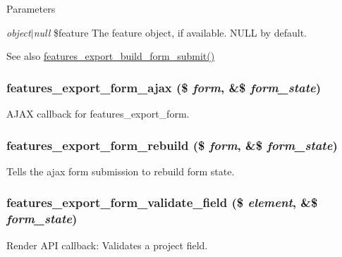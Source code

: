 \begin{DoxyParams}{Parameters}
\item[{\em object$|$null}]\$feature The feature object, if available. NULL by default.\end{DoxyParams}
\begin{DoxySeeAlso}{See also}
\hyperlink{features_8admin_8inc_afb232d8f40ae6b186567c6091ef0550e}{features\_\-export\_\-build\_\-form\_\-submit()} 
\end{DoxySeeAlso}
\hypertarget{features_8admin_8inc_a0c79652184d03c394b6bccba1704d93d}{
\subsubsection[{features\_\-export\_\-form\_\-ajax}]{\setlength{\rightskip}{0pt plus 5cm}features\_\-export\_\-form\_\-ajax (\$ {\em form}, \/  \&\$ {\em form\_\-state})}}
\label{features_8admin_8inc_a0c79652184d03c394b6bccba1704d93d}
AJAX callback for features\_\-export\_\-form. \hypertarget{features_8admin_8inc_a9d25b511fe410f560211cfa78edb08c2}{
\subsubsection[{features\_\-export\_\-form\_\-rebuild}]{\setlength{\rightskip}{0pt plus 5cm}features\_\-export\_\-form\_\-rebuild (\$ {\em form}, \/  \&\$ {\em form\_\-state})}}
\label{features_8admin_8inc_a9d25b511fe410f560211cfa78edb08c2}
Tells the ajax form submission to rebuild form state. \hypertarget{features_8admin_8inc_a958b7918ee49cbc5e079c02bf89cbb18}{
\subsubsection[{features\_\-export\_\-form\_\-validate\_\-field}]{\setlength{\rightskip}{0pt plus 5cm}features\_\-export\_\-form\_\-validate\_\-field (\$ {\em element}, \/  \&\$ {\em form\_\-state})}}
\label{features_8admin_8inc_a958b7918ee49cbc5e079c02bf89cbb18}
Render API callback: Validates a project field.

